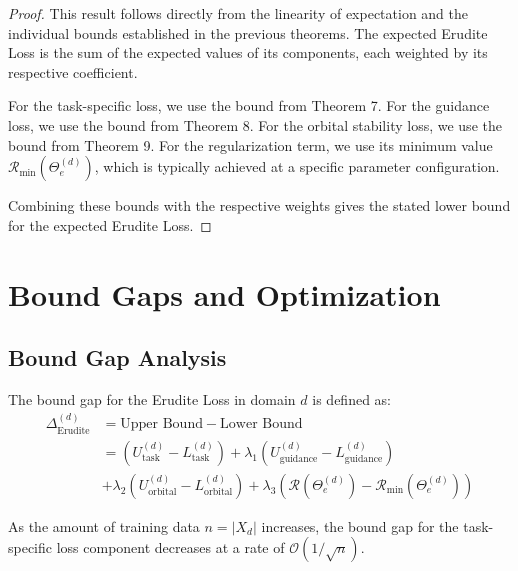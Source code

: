 \begin{proof}
This result follows directly from the linearity of expectation and the individual bounds established in the previous theorems. The expected Erudite Loss is the sum of the expected values of its components, each weighted by its respective coefficient.

For the task-specific loss, we use the bound from Theorem 7. For the guidance loss, we use the bound from Theorem 8. For the orbital stability loss, we use the bound from Theorem 9. For the regularization term, we use its minimum value $\mathcal{R}_{\text{min}}(\Theta_e^{(d)})$, which is typically achieved at a specific parameter configuration.

Combining these bounds with the respective weights gives the stated lower bound for the expected Erudite Loss.
\end{proof}

\section{Bound Gaps and Optimization}

\subsection{Bound Gap Analysis}

\begin{definition}
The bound gap for the Erudite Loss in domain $d$ is defined as:
\begin{align}
\Delta_{\text{Erudite}}^{(d)} &= \text{Upper Bound} - \text{Lower Bound} \\
&= \left(U_{\text{task}}^{(d)} - L_{\text{task}}^{(d)}\right) + \lambda_1\left(U_{\text{guidance}}^{(d)} - L_{\text{guidance}}^{(d)}\right) \\
&+ \lambda_2\left(U_{\text{orbital}}^{(d)} - L_{\text{orbital}}^{(d)}\right) + \lambda_3\left(\mathcal{R}(\Theta_e^{(d)}) - \mathcal{R}_{\text{min}}(\Theta_e^{(d)})\right)
\end{align}
\end{definition}

\begin{theorem}
As the amount of training data $n = |X_d|$ increases, the bound gap for the task-specific loss component decreases at a rate of $\mathcal{O}(1/\sqrt{n})$.
\end{theorem}

